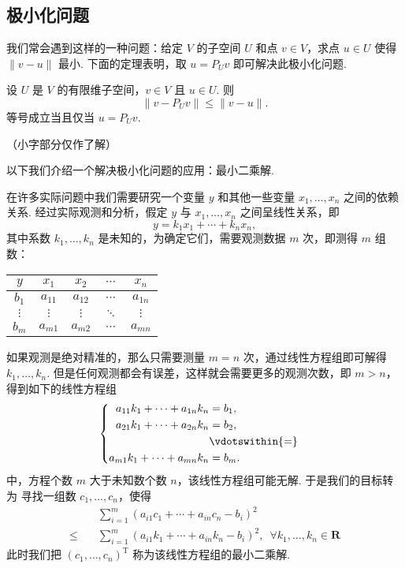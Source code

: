 \subsection{极小化问题}

我们常会遇到这样的一种问题：给定 $ V $ 的子空间 $ U $ 和点 $ v \in V $，求点
$ u \in U $ 使得 $ \lVert v - u \rVert $ 最小. 下面的定理表明，取 $ u = P_U v$
即可解决此极小化问题.

\begin{theorem}
    设 $ U $ 是 $ V $ 的有限维子空间，$ v \in V $ 且 $ u \in U $. 则
    \[\lVert v - P_U v \rVert \leqslant \lVert v - u \rVert. \]
    等号成立当且仅当 $ u = P_U v $.
\end{theorem}

\footnotesize
（小字部分仅作了解）

以下我们介绍一个解决极小化问题的应用：最小二乘解.

在许多实际问题中我们需要研究一个变量 $ y $ 和其他一些变量 $ x_1, \ldots , x_n $
之间的依赖关系. 经过实际观测和分析，假定 $ y $ 与 $ x_1, \ldots , x_n $ 之间呈线性关系，即
\[ y = k_1 x_1 + \cdots + k_n x_n, \]
其中系数 $ k_1, \ldots , k_n $ 是未知的，为确定它们，需要观测数据 $ m $ 次，即测得 $ m $ 组数：
\begin{center}
    \begin{tabular}{ccccc}
        $ y $ & $ x_1 $ & $ x_2 $ & $ \cdots $ & $ x_n $ \\
        \hline
        $ b_1 $ & $ a_{11} $ & $ a_{12} $ & $ \cdots $ & $ a_{1n}$ \\
        $ \vdots $ & $ \vdots $ & $ \vdots $ & $ \ddots $ & $ \vdots $ \\
        $ b_m $ & $ a_{m1} $ & $ a_{m2} $ & $ \cdots $ & $ a_{mn}$
    \end{tabular}
\end{center}
如果观测是绝对精准的，那么只需要测量 $ m = n $ 次，通过线性方程组即可解得 $ k_1, \ldots , k_n $.
但是任何观测都会有误差，这样就会需要更多的观测次数，即 $ m > n $，得到如下的线性方程组
\[ \begin{cases} \begin{aligned}
    a_{11}k_1 + \cdots + a_{1n}k_n &= b_1, \\
    a_{21}k_1 + \cdots + a_{2n}k_n &= b_2, \\
    & \vdotswithin{ = } \\
    a_{m1}k_1 + \cdots + a_{mn}k_n &= b_m.  \\
\end{aligned} \end{cases} \]
中，方程个数 $ m $ 大于未知数个数 $ n $，该线性方程组可能无解. 于是我们的目标转为
寻找一组数 $ c_1, \ldots , c_n $，使得
\begin{align*}
        & \sum _{ i = 1 }^{m} (a_{i1}c_1 + \cdots  + a_{in}c_n - b_i )^{2} \\
        \leqslant \quad & \sum _{ i = 1 }^{m} (a_{i1}k_1 + \cdots  + a_{in}k_n - b_i )^{2}, \enspace \forall k_1, \ldots , k_n \in \mathbf{R}
\end{align*}
此时我们把 $ (c_1, \ldots , c_n)^{\mathrm{T}} $ 称为该线性方程组的最小二乘解.

